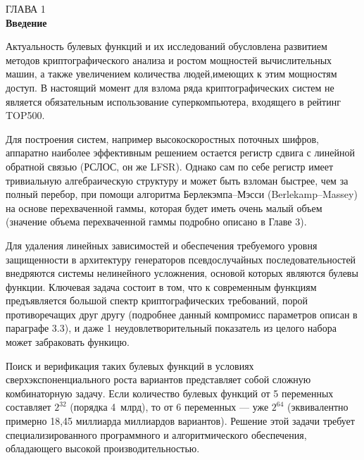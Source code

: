 \documentclass[14pt, a4paper]{extarticle}
\begin{document}

\begin{center}
    {\large ГЛАВА 1} \\[0.5em]
    {\large \textbf{Введение}}
\end{center}
\vspace{1em}


Актуальность булевых функций и их исследований обусловлена развитием методов криптографического анализа
и ростом мощностей вычислительных машин, а также увеличением количества людей,имеющих к этим мощностям доступ.
В настоящий момент для взлома ряда криптографических систем не является обязательным использование суперкомпьютера,
входящего в рейтинг TOP500.

Для построения систем, например высокоскоростных поточных шифров,
аппаратно наиболее эффективным решением остается регистр сдвига с линейной обратной связью (РСЛОС, он же LFSR).
Однако сам по себе регистр имеет тривиальную алгебраическую структуру и может быть взломан быстрее,
чем за полный перебор,
при помощи алгоритма Берлекэмпа--Мэсси (Berlekamp--Massey) на основе перехваченной гаммы,
которая будет иметь очень малый объем (значение объема перехваченной гаммы подробно описано в Главе 3).

Для удаления линейных зависимостей
и обеспечения требуемого уровня защищенности в архитектуру генераторов псевдослучайных последовательностей внедряются системы нелинейного усложнения,
основой которых являются булевы функции.
Ключевая задача состоит в том,
что к современным функциям предъявляется большой спектр криптографических требований,
порой противоречащих друг другу (подробнее данный компромисс параметров описан в параграфе 3.3),
и даже 1 неудовлетворительный показатель из целого набора может забраковать функицю.

Поиск и верификация таких булевых функций в условиях сверхэкспоненциального роста вариантов представляет собой сложную комбинаторную задачу.
Если количество булевых функций от 5 переменных составляет $2^{32}$ (порядка 4~млрд),
то от 6 переменных --- уже $2^{64}$ (эквивалентно примерно 18,45 миллиарда миллиардов вариантов).
Решение этой задачи требует специализированного программного и алгоритмического обеспечения,
обладающего высокой производительностью.
\end{document}
